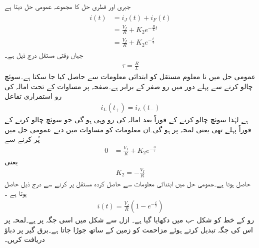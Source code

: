 جبری اور فطری حل کا مجموعہ عمومی حل دیتا ہے
\begin{gather}
\begin{aligned}\label{مساوات_عارضی_مزاحمت_امالہ_مکمل_حل_الف}
i(t)&=i_J(t)+i_F(t)\\
&=\frac{V_I}{R}+K_2e^{-\frac{R}{L}t}\\
&=\frac{V_I}{R}+K_2e^{-\frac{t}{\tau}}
\end{aligned}
\end{gather}
جہاں وقتی مستقل درج ذیل ہے۔
\begin{align}
\tau=\frac{R}{L}
\end{align}
عمومی حل میں نا معلوم مستقل  کو ابتدائی معلومات سے حاصل کیا جا سکتا ہے۔سوئچ چالو کرنے سے پہلے دور میں رو صفر کے برابر ہے۔صفحہ  پر مساوات  کے تحت امالہ کی رو استمراری تفاعل
\begin{align*}
i_L(t_+)=i_L(t_-)
\end{align*} 
ہے لہٰذا سوئچ چالو کرنے کے فوراً بعد امالہ کی رو وہی ہو گی جو سوئچ چالو کرنے کے فوراً پہلے تھی یعنی لمحہ  پر  ہو گی۔ان معلومات کو مساوات  میں دیے عمومی حل میں پُر کرنے سے
\begin{align*}
0&=\frac{V_I}{R}+K_2e^{-\frac{0}{\tau}}
\end{align*}
یعنی
\begin{align*}
K_2=-\frac{V_I}{R}
\end{align*}
حاصل ہوتا ہے۔عمومی حل میں ابتدائی معلومات سے حاصل کردہ مستقل پر کرنے سے درج ذیل  حاصل ہوتا ہے ۔
\begin{align}
i(t)=\frac{V_I}{R} \left(1-e^{-\frac{t}{\tau}}\right)
\end{align}
رو کے خط کو شکل -ب میں دکھایا گیا ہے۔
ازل سے شکل  میں  اسی جگہ پر ہے۔لمحہ  پر اس کی جگہ تبدیل کرتے ہوئے  مزاحمت کو زمین کے ساتھ جوڑا جاتا ہے۔برق گیر پر دباؤ دریافت کریں۔
